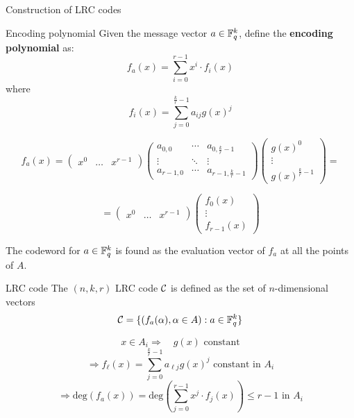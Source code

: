     \begin{frame}{Construction of LRC codes}
        \begin{block}{Encoding polynomial}
            Given the message vector $a \in \mathbb{F}_q^k$, define the \textbf{encoding polynomial} as:
            $$ f_a(x) = \sum_{i=0}^{r-1} x^i \cdot f_i(x) $$
            where
            $$f_i(x) = \sum_{j=0}^{\frac{k}{r}-1} a_{ij} g(x)^j $$
        \end{block}
    \end{frame}
    \begin{frame}
        $$ f_a(x) =
        \begin{pmatrix}
            x^0 & \dots & x^{r-1}
        \end{pmatrix}
        \begin{pmatrix}
            a_{0,0} & \cdots & a_{0,\frac{k}{r}-1} \\
            \vdots  & \ddots & \vdots \\
            a_{r-1,0} & \cdots & a_{r-1,\frac{k}{r}-1}
        \end{pmatrix}
        \begin{pmatrix}
            g(x)^0 \\
            \vdots \\
            g(x)^{\frac{k}{r}-1}
        \end{pmatrix} =
        $$
        
        $$
        =
        \begin{pmatrix}
            x^0 & \dots & x^{r-1}
        \end{pmatrix}
        \begin{pmatrix}
            f_0(x) \\
            \vdots \\
            f_{r-1}(x)
        \end{pmatrix}
        $$
    \end{frame}
    
    \begin{frame}
        The codeword for $a \in \mathbb{F}_q^k$ is found as the evaluation vector of $f_a$ at all the points of $A$.
        \begin{block}{LRC code}
            The $(n,k,r)$ LRC code $\mathcal{C}$ is defined as the set of $n$-dimensional vectors
            $$\mathcal{C} = \{ (f_a(\alpha), \alpha \in A) : a \in \mathbb{F}_q^k \}$$
        \end{block}
    \end{frame}
    
\begin{frame}
    \begin{rmk}
        $$x \in A_i \Rightarrow \quad g(x) \mbox{ constant}$$
        $$\Rightarrow f_\ell(x) = \sum_{j=0}^{\frac{k}{r}-1} a_{\ell j} g(x)^j \mbox{ constant in } A_i$$
        $$\Rightarrow \text{deg}(f_a(x)) = \text{deg}(\sum_{j=0}^{r-1} x^j \cdot f_j(x)) \leq r-1 \mbox{ in } A_i$$
    \end{rmk}
\end{frame}

